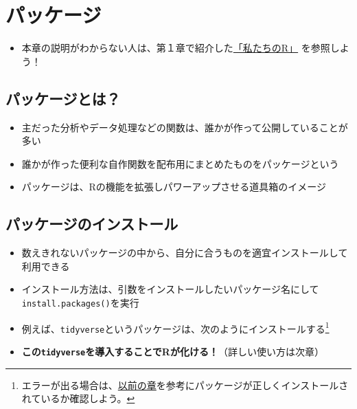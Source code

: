 \documentclass[
]{book}
\providecommand{\tightlist}{%
  \setlength{\itemsep}{0pt}\setlength{\parskip}{0pt}}
\begin{document}
\hypertarget{ux30d1ux30c3ux30b1ux30fcux30b8}{%
\chapter{パッケージ}\label{ux30d1ux30c3ux30b1ux30fcux30b8}}

\begin{itemize}
\tightlist
\item
  本章の説明がわからない人は、第１章で紹介した\href{https://www.jaysong.net/RBook/datahandling1.html}{「私たちのR」} を参照しよう！
\end{itemize}

\hypertarget{ux30d1ux30c3ux30b1ux30fcux30b8ux3068ux306f}{%
\section{パッケージとは？}\label{ux30d1ux30c3ux30b1ux30fcux30b8ux3068ux306f}}

\begin{itemize}
\tightlist
\item
  主だった分析やデータ処理などの関数は、誰かが作って公開していることが多い
\item
  誰かが作った便利な自作関数を配布用にまとめたものをパッケージという
\item
  パッケージは、Rの機能を拡張しパワーアップさせる道具箱のイメージ
\end{itemize}

\hypertarget{ux30d1ux30c3ux30b1ux30fcux30b8ux306eux30a4ux30f3ux30b9ux30c8ux30fcux30eb}{%
\section{パッケージのインストール}\label{ux30d1ux30c3ux30b1ux30fcux30b8ux306eux30a4ux30f3ux30b9ux30c8ux30fcux30eb}}

\begin{itemize}
\tightlist
\item
  数えきれないパッケージの中から、自分に合うものを適宜インストールして利用できる
\item
  インストール方法は、引数をインストールしたいパッケージ名にして\texttt{install.packages()}を実行
\item
  例えば、\texttt{tidyverse}というパッケージは、次のようにインストールする\footnote{エラーが出る場合は、\protect\hyperlink{ux30d1ux30c3ux30b1ux30fcux30b8ux306eux30a4ux30f3ux30b9ux30c8ux30fcux30eb}{以前の章}を参考にパッケージが正しくインストールされているか確認しよう。}
\item
  \textbf{この\texttt{tidyverse}を導入することでRが化ける！}（詳しい使い方は次章）
\end{itemize}
\end{document}
